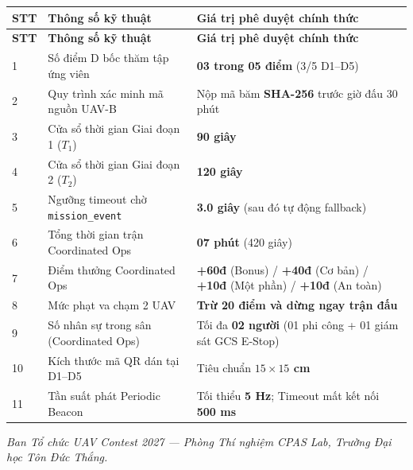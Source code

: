 \documentclass[12pt,a4paper]{article}
\begin{document}
\begin{longtable}{p{1.0cm}p{6.5cm}p{6.5cm}}
\toprule
\textbf{STT} & \textbf{Thông số kỹ thuật} & \textbf{Giá trị phê duyệt chính thức} \\
\midrule
\endfirsthead
\toprule
\textbf{STT} & \textbf{Thông số kỹ thuật} & \textbf{Giá trị phê duyệt chính thức} \\
\midrule
\endhead
1 & Số điểm D bốc thăm tập ứng viên & \textbf{03 trong 05 điểm} (3/5 D1–D5) \\
2 & Quy trình xác minh mã nguồn UAV-B & Nộp mã băm \textbf{SHA-256} trước giờ đấu 30 phút \\
3 & Cửa sổ thời gian Giai đoạn 1 ($T_1$) & \textbf{90 giây} \\
4 & Cửa sổ thời gian Giai đoạn 2 ($T_2$) & \textbf{120 giây} \\
5 & Ngưỡng timeout chờ \texttt{mission\_event} & \textbf{3.0 giây} (sau đó tự động fallback) \\
6 & Tổng thời gian trận Coordinated Ops & \textbf{07 phút} (420 giây) \\
7 & Điểm thưởng Coordinated Ops & \textbf{+60đ} (Bonus) / \textbf{+40đ} (Cơ bản) / \textbf{+10đ} (Một phần) / \textbf{+10đ} (An toàn) \\
8 & Mức phạt va chạm 2 UAV & \textbf{Trừ 20 điểm và dừng ngay trận đấu} \\
9 & Số nhân sự trong sân (Coordinated Ops) & Tối đa \textbf{02 người} (01 phi công + 01 giám sát GCS E-Stop) \\
10 & Kích thước mã QR dán tại D1–D5 & Tiêu chuẩn \textbf{$15 \times 15$ cm} \\
11 & Tần suất phát Periodic Beacon & Tối thiểu \textbf{5 Hz}; Timeout mất kết nối \textbf{500 ms} \\
\bottomrule
\end{longtable}

\vspace{1cm}
\noindent\textit{Ban Tổ chức UAV Contest 2027 — Phòng Thí nghiệm CPAS Lab, Trường Đại học Tôn Đức Thắng.}
\end{document}
